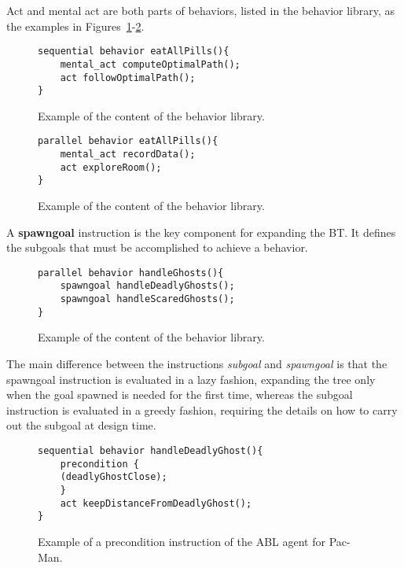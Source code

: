 Act and mental act are both parts of behaviors, listed in  the behavior library, as the examples in Figures~\ref{planning:abl.fig.abtintro2}-\ref{planning:abl.fig.abtintro2bis}.

\begin{figure}[h]
\centering
\begin{lstlisting}
sequential behavior eatAllPills(){
	mental_act computeOptimalPath();
	act followOptimalPath();
}
\end{lstlisting}
\caption{Example of the content of the behavior library.}
\label{planning:abl.fig.abtintro2}
\end{figure}

\begin{figure}[h]
\centering
\begin{lstlisting}
parallel behavior eatAllPills(){
	mental_act recordData();
	act exploreRoom();
}
\end{lstlisting}
\caption{Example of the content of the behavior library.}
\label{planning:abl.fig.abtintro2bis}
\end{figure}

A \textbf{spawngoal} instruction is the key component for expanding the BT. It defines the subgoals that must be accomplished to achieve a behavior.

\begin{figure}[h]
\centering
\begin{lstlisting}
parallel behavior handleGhosts(){
	spawngoal handleDeadlyGhosts();
	spawngoal handleScaredGhosts();
}
\end{lstlisting}
\caption{Example of the content of the behavior library. }
\label{planning:rt.fig.abtintro3}
\end{figure}




\begin{remark}
The main difference between the instructions \emph{subgoal} and \emph{spawngoal} is that the spawngoal instruction is evaluated in a lazy fashion, expanding the tree only when the goal spawned is needed for the first time, whereas the subgoal instruction is evaluated in a greedy fashion, requiring the details on how to carry out the subgoal at design time.   
\end{remark}


\begin{figure}[h]
\centering
\begin{lstlisting}
sequential behavior handleDeadlyGhost(){
	precondition {
	(deadlyGhostClose);
	}
	act keepDistanceFromDeadlyGhost();
}
\end{lstlisting}
\caption{Example of a precondition instruction of the ABL agent for Pac-Man.}
\label{planning:abl.fig.abtintro4}
\end{figure}


